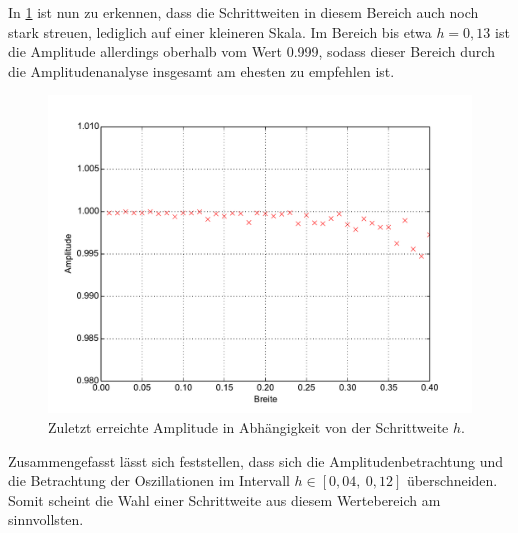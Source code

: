 In \cref{fig:Stabilitaet_Nah} ist nun zu erkennen, dass die Schrittweiten in diesem Bereich auch noch stark streuen, lediglich auf einer kleineren Skala.
Im Bereich bis etwa $h=0,13$ ist die Amplitude allerdings oberhalb vom Wert 0.999, sodass dieser Bereich durch die Amplitudenanalyse insgesamt am ehesten zu empfehlen ist.
\begin{figure}[h]
	\centering
	\includegraphics[width = \textwidth]{../Plots/Plot_2_B_Stabilitaet_Nah.pdf}
	\caption{Zuletzt erreichte Amplitude in Abhängigkeit von der Schrittweite $h$.\label{fig:Stabilitaet_Nah}}
\end{figure}
Zusammengefasst lässt sich feststellen, dass sich die Amplitudenbetrachtung und die Betrachtung der Oszillationen im Intervall $h\in[0,04,~0,12]$ überschneiden.
Somit scheint die Wahl einer Schrittweite aus diesem Wertebereich am sinnvollsten.